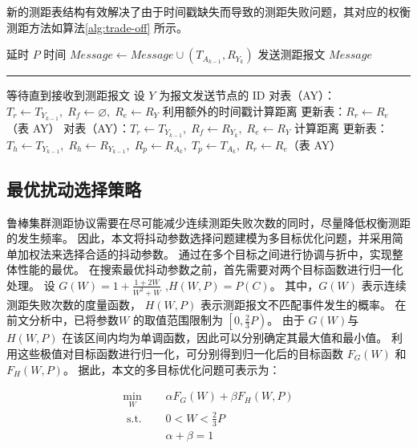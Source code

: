 新的测距表结构有效解决了由于时间戳缺失而导致的测距失败问题，其对应的权衡测距方法如算法\ref{alg:trade-off} 所示。

\begin{algorithm}[H]
  \caption{权衡测距算法}
  \label{alg:trade-off}
  \begin{algorithmic}[1]
  
    
      \State 延时 $P$ 时间
          \State $Message \gets Message \cup (T_{A_{k-1}}, R_{Y_k})$
      \EndFor
      \State 发送测距报文 $Message$
  \EndWhile
  \Statex
  \Statex \rule{\linewidth}{0.4pt}
  \Statex
  
   
      \State 等待直到接收到测距报文
      \State 设 $Y$ 为报文发送节点的 ID
          \State 对表（AY）：$T_r \gets T_{Y_{k-1}},\; R_f \gets \varnothing,\; R_e \gets R_{Y}$
          \State 利用额外的时间戳计算距离
          \State 更新表：$R_r \gets R_e$（表 AY）
      \Else
          \State 对表（AY）：$T_r \gets T_{Y_{k-1}},\; R_f \gets R_{Y_k},\; R_e \gets R_{Y}$
          \State 计算距离
          \State 更新表：$T_h \gets T_{Y_{k-1}},\; R_h \gets R_{Y_{k-1}},\; R_p \gets R_{A_k},\; T_p \gets T_{A_k},\; R_r \gets R_e$（表 AY）
      \EndIf
  \EndWhile
  
  \end{algorithmic}
\end{algorithm}
      
\subsection{最优扰动选择策略}

鲁棒集群测距协议需要在尽可能减少连续测距失败次数的同时，尽量降低权衡测距的发生频率。
因此，本文将抖动参数选择问题建模为多目标优化问题，并采用简单加权法来选择合适的抖动参数。
通过在多个目标之间进行协调与折中，实现整体性能的最优。 
在搜索最优抖动参数之前，首先需要对两个目标函数进行归一化处理。
设 $G(W)=1+\frac{1+2W}{W^2+W}$ ,$H(W,P)=P(C)$。
其中，$ G(W)$ 表示连续测距失败次数的度量函数， $H(W,P)$ 表示测距报文不匹配事件发生的概率。
在前文分析中，已将参数$W$ 的取值范围限制为 $\left [ 0, \frac{2}{3}P \right )$。
由于 $G(W)$与 $H(W,P)$ 在该区间内均为单调函数，因此可以分别确定其最大值和最小值。
利用这些极值对目标函数进行归一化，可分别得到归一化后的目标函数 $F_{G}(W)$ 和 $F_{H}(W,P)$。 
据此，本文的多目标优化问题可表示为：


  \begin{equation}
  \begin{aligned}
  \underset{W}{\min }\quad &  \alpha F_{G}(W)+\beta F_{H}(W,P)\\
  \text { s.t. }\quad & 0< W < \frac{2}{3}P\\
  & \alpha + \beta = 1
  \end{aligned}
  \end{equation}


